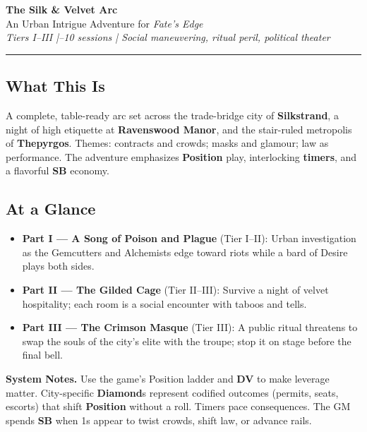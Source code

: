 \documentclass[11pt]{article}
\newcommand{\Term}[1]{\textbf{#1}}
\newcommand{\DV}{\Term{DV}}
\newcommand{\Position}{\Term{Position}}
\newcommand{\SB}{\Term{SB}}
\newcommand{\Diamond}{\Term{Diamond}}
\begin{document}


\begin{center}
{\LARGE \textbf{The Silk \& Velvet Arc}}\\[4pt]
{\large An Urban Intrigue Adventure for \emph{Fate's Edge}}\\[2pt]
\textit{Tiers I--III \;|--10 sessions \;|\; Social maneuvering, ritual peril, political theater}
\end{center}

\hrule
\vspace{0.5em}

\subsection*{What This Is}
A complete, table-ready arc set across the trade-bridge city of \textbf{Silkstrand}, a night of high etiquette at \textbf{Ravenswood Manor}, and the stair-ruled metropolis of \textbf{Thepyrgos}. Themes: contracts and crowds; masks and glamour; law as performance. The adventure emphasizes \Position{} play, interlocking \Term{timers}, and a flavorful \SB{} economy.

\subsection*{At a Glance}
\begin{itemize}
  \item \textbf{Part I --- A Song of Poison and Plague} (Tier I--II): Urban investigation as the Gemcutters and Alchemists edge toward riots while a bard of Desire plays both sides.
  \item \textbf{Part II --- The Gilded Cage} (Tier II--III): Survive a night of velvet hospitality; each room is a social encounter with taboos and tells.
  \item \textbf{Part III --- The Crimson Masque} (Tier III): A public ritual threatens to swap the souls of the city's elite with the troupe; stop it on stage before the final bell.
\end{itemize}

\begin{tcolorbox}[breakable]
\textbf{System Notes.} Use the game's Position ladder and \DV{} to make leverage matter. City-specific \Diamond{}s represent codified outcomes (permits, seats, escorts) that shift \Position{} without a roll. Timers pace consequences. The GM spends \SB{} when 1s appear to twist crowds, shift law, or advance rails.
\end{tcolorbox}
\end{document}
